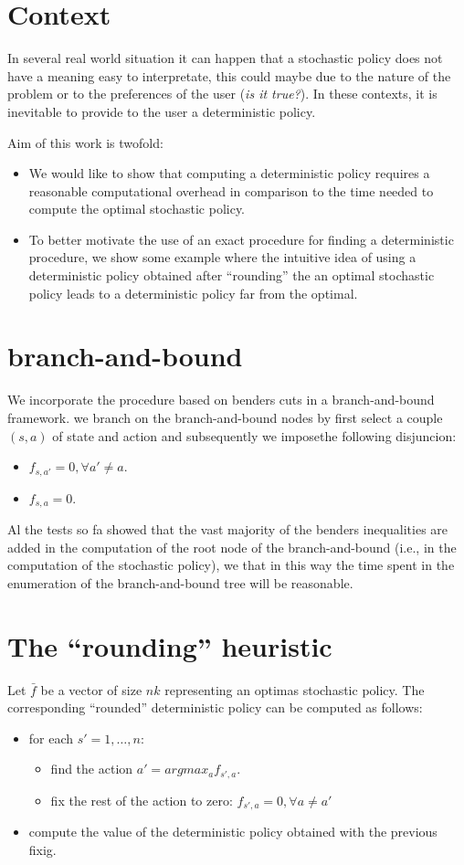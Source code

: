 \documentclass[10pt,a4paper]{article}
\begin{document}
\section{Context}
In several real world situation it can happen that a stochastic policy does not have a meaning easy to interpretate, this could maybe due to the nature of the problem or to the preferences of the user   (\textit{is it true?}). In these contexts, it is inevitable to provide to the user a deterministic policy. 

Aim of this work is twofold:
\begin{itemize}
\item We would like to show that computing a deterministic policy requires a reasonable computational  overhead in  comparison to the time needed to compute the optimal stochastic policy.
\item To better motivate the use of an exact procedure for finding a deterministic procedure, we show some example where the intuitive idea of using a deterministic policy obtained after ``rounding'' the an optimal stochastic policy leads to a deterministic policy far from the optimal.   
\end{itemize}

\section{branch-and-bound}

We incorporate the procedure based on benders cuts in a branch-and-bound framework. we branch on the branch-and-bound nodes by first select a couple $(s,a)$ of state and action and subsequently we imposethe following disjuncion:
\begin{itemize}
\item $f_{s,a'}=0, \forall a'\neq a$.
\item $f_{s,a}=0$.
\end{itemize} 
Al the tests so fa showed that the vast majority of the benders inequalities are added in the computation of the root node of the branch-and-bound (i.e., in the computation of the stochastic policy), we that in this way the time spent in the enumeration of the branch-and-bound tree will be reasonable.


\section{The ``rounding'' heuristic}

Let $\bar{f}$ be a vector of size  $nk$ representing an optimas stochastic policy. The corresponding ``rounded'' deterministic policy can be computed as follows:
\begin{itemize}
\item for each $s'=1,\dots,n$:
\begin{itemize}
\item find the action $a' = argmax_{a}f_{s',a}$.
\item fix the rest of the action to zero: $f_{s',a} =0, \forall a \neq a'$
\end{itemize}
\item compute the value of the deterministic policy obtained with the previous fixig.
\end{itemize}
 
\end{document}
